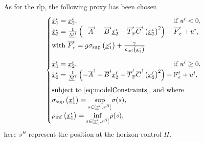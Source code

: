 As for the \gls{rlp}, the following proxy has been chosen
\begin{equation}
	\begin{cases}
		\underline{\dot{x}}_1^i =   \underline{x}_2^i, \qquad  \qquad \qquad \qquad \qquad \qquad  \qquad  \text{if} \; u^i < 0,  \\
		\underline{\dot{x}}_2^i =  \frac{1}{\underline{M}^i} \left(-\overline{A}^i - \overline{B}^i \underline{x}^i_2 - \overline{T}^i_\mathrm{F} \overline{C}^i \left(\underline{x}^i_2\right)^2 \right)-\overline{F}_e^i + u^i, \\ \noalign{\vskip3pt}
		\textrm{with } \overline{F}_e^i =  g \sigma_{\sup}\left(\underline{x}^i_1\right)+ \frac{\gamma}{\rho_{\inf}\left(\underline{x}^i_1\right)} \\
		\noalign{\vskip9pt}
		\underline{\dot{x}}_1^i =   \underline{x}_2^i, \qquad \qquad \qquad  \qquad \qquad \qquad \qquad \text{if} \; u^i \geq 0,  \\
		\underline{\dot{x}}_2^i =  \frac{1}{\underline{M}^i} \left(-\overline{A}^i - \overline{B}^i \underline{x}^i_2 - \overline{T}^i_\mathrm{F} \overline{C}^i \left(\underline{x}^i_2\right)^2 \right)-\mathrm{F}_e^i  + u^i, \\
		\noalign{\vskip6pt}
		\textrm{subject to } \eqref{eq:modelConstraints} \textrm{, and where} \\
		\sigma_{\sup}\left(\underline{x}^i_1\right) = \underset{s \in [\underline{x}_1^i,s^H]}{\sup} \sigma(s), \\
		\rho_{\inf}\left(\underline{x}^i_1\right) = \underset{s \in [\underline{x}_1^i,s^H]}{\inf} \rho(s),
	\end{cases}
\end{equation}
here $s^H$ represent the position at the horizon control $H$.

